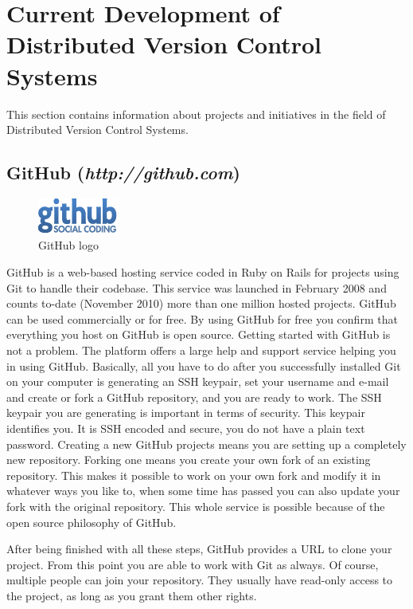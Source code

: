 \section{Current Development of Distributed Version Control Systems}\label{currentdevelopment}

This section contains information about projects and initiatives in the field of Distributed Version Control Systems.

\subsection{GitHub (\textit{http://github.com})}
\begin{figure}[h]
  \centering 
  \includegraphics{img/github}
  \caption{GitHub logo}
  \label{}
\end{figure}
GitHub is a web-based hosting service coded in Ruby on Rails for projects using Git to handle their codebase. This service was launched in February 2008 and counts to-date (November 2010) more than one million hosted projects. GitHub can be used commercially or for free. By using GitHub for free you confirm that everything you host on GitHub is open source.
Getting started with GitHub is not a problem. The platform offers a large help and support service helping you in using GitHub.
Basically, all you have to do after you successfully installed Git on your computer is generating an SSH keypair, set your username and e-mail and create or fork a GitHub repository, and you are ready to work.
The SSH keypair you are generating is important in terms of security. This keypair identifies you. It is SSH encoded and secure, you do not have a plain text password.
Creating a new GitHub projects means you are setting up a completely new repository. Forking one means you create your own fork of an existing repository. This makes it possible to work on your own fork and modify it in whatever ways you like to, when some time has passed you can also update your fork with the original repository. This whole service is possible because of the open source philosophy of GitHub.

After being finished with all these steps, GitHub provides a URL to clone your project. From this point you are able to work with Git as always. Of course, multiple people can join your repository. They usually have read-only access to the project, as long as you grant them other rights.

